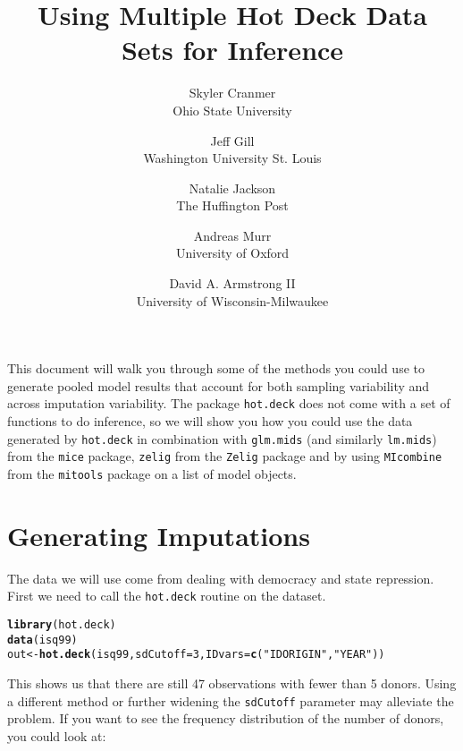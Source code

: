 \documentclass[12pt]{article}\usepackage[]{graphicx}\usepackage[]{color}
\author{Skyler Cranmer\\Ohio State University \and Jeff Gill\\Washington University St. Louis \and Natalie Jackson\\The Huffington Post \and Andreas Murr\\University of Oxford \and David A. Armstrong II\\University of Wisconsin-Milwaukee}
\title{Using Multiple Hot Deck Data Sets for Inference}
\makeatletter
\newcommand{\hlnum}[1]{\textcolor[rgb]{0.686,0.059,0.569}{#1}}%
\newcommand{\hlstr}[1]{\textcolor[rgb]{0.192,0.494,0.8}{#1}}%
\newcommand{\hlstd}[1]{\textcolor[rgb]{0.345,0.345,0.345}{#1}}%
\newcommand{\hlkwb}[1]{\textcolor[rgb]{0.69,0.353,0.396}{#1}}%
\newcommand{\hlkwc}[1]{\textcolor[rgb]{0.333,0.667,0.333}{#1}}%
\newcommand{\hlkwd}[1]{\textcolor[rgb]{0.737,0.353,0.396}{\textbf{#1}}}%
\newenvironment{kframe}{%
 \def\at@end@of@kframe{}%
 \ifinner\ifhmode%
  \def\at@end@of@kframe{\end{minipage}}%
  \begin{minipage}{\columnwidth}%
 \fi\fi%
 \def\FrameCommand##1{\hskip\@totalleftmargin \hskip-\fboxsep
 \colorbox{shadecolor}{##1}\hskip-\fboxsep
     \hskip-\linewidth \hskip-\@totalleftmargin \hskip\columnwidth}%
 \MakeFramed {\advance\hsize-\width
   \@totalleftmargin\z@ \linewidth\hsize
   \@setminipage}}%
 {\par\unskip\endMakeFramed%
 \at@end@of@kframe}
\newenvironment{knitrout}{}{} %
\makeatother
\begin{document}
\maketitle





This document will walk you through some of the methods you could use to generate pooled model results that account for both sampling variability and across imputation variability.  The package \verb"hot.deck" does not come with a set of functions to do inference, so we will show you how you could use the data generated by \verb"hot.deck" in combination with \verb"glm.mids" (and similarly \verb"lm.mids") from the \verb"mice" package, \verb"zelig" from the \verb"Zelig" package and by using \verb"MIcombine" from the \verb"mitools" package on a list of model objects.  

\section{Generating Imputations}

The data we will use come from \citet{Poeetal1999} dealing with democracy and state repression.  First we need to call the \verb"hot.deck" routine on the dataset.  

\begin{scriptsize}
\begin{knitrout}
\color{fgcolor}\begin{kframe}
\begin{alltt}
\hlkwd{library}\hlstd{(hot.deck)}
\hlkwd{data}\hlstd{(isq99)}
\hlstd{out} \hlkwb{<-} \hlkwd{hot.deck}\hlstd{(isq99,} \hlkwc{sdCutoff}\hlstd{=}\hlnum{3}\hlstd{,} \hlkwc{IDvars} \hlstd{=} \hlkwd{c}\hlstd{(}\hlstr{"IDORIGIN"}\hlstd{,} \hlstr{"YEAR"}\hlstd{))}
\end{alltt}


{\ttfamily\noindent{}}

{\ttfamily\noindent{}}\end{kframe}
\end{knitrout}

\end{scriptsize} 
This shows us that there are still 47 observations with fewer than 5 donors.  Using a different method or further widening the \verb"sdCutoff" parameter may alleviate the problem.  If you want to see the frequency distribution of the number of donors, you could look at: 
\end{document}
